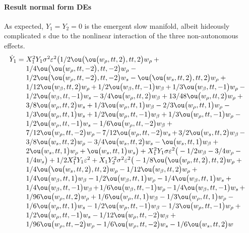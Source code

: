 \paragraph{Result normal form DEs}
As expected, \(Y_1=Y_2=0\) is the emergent slow manifold, albeit hideously complicated \sde{}s due to the nonlinear interaction of the three non-autonomous effects.
\begin{align*}&
\dot Y_{1}=\ParMath{ X_{1}^{2} Y_{1} \sigma ^{2} \eps^{2} \big(1/2 \ou\big(\ou
\big(w_{\rho },tt,2\big),tt,2\big) w_{\rho }+1/4 \ou\big(\ou\big(w_{
\rho },tt,-2\big),tt,-2\big) w_{\rho }-1/2 \ou\big(\ou\big(w_{\rho },tt,
-2\big),tt,-2\big) w_{s}-\ou\big(\ou\big(w_{s},tt,2\big),tt,2\big) w_{
\rho }+1/12 \ou\big(w_{\beta },tt,2\big) w_{\rho }+1/2 \ou\big(w_{\beta 
},tt,-1\big) w_{\beta }+1/3 \ou\big(w_{\beta },tt,-1\big) w_{\rho }-1/2 
\ou\big(w_{\beta },tt,-1\big) w_{s}-3/4 \ou\big(w_{\rho },tt,2\big) w_{
\beta }+13/48 \ou\big(w_{\rho },tt,2\big) w_{\rho }+3/8 \ou\big(w_{\rho 
},tt,2\big) w_{s}+1/3 \ou\big(w_{\rho },tt,1\big) w_{\beta }-2/3 \ou
\big(w_{\rho },tt,1\big) w_{\rho }-1/3 \ou\big(w_{\rho },tt,1\big) w_{s}
+1/2 \ou\big(w_{\rho },tt,-1\big) w_{\beta }+1/3 \ou\big(w_{\rho },tt,-1
\big) w_{\rho }-1/2 \ou\big(w_{\rho },tt,-1\big) w_{s}-1/6 \ou\big(w_{
\rho },tt,-2\big) w_{\beta }+7/12 \ou\big(w_{\rho },tt,-2\big) w_{\rho }
-7/12 \ou\big(w_{\rho },tt,-2\big) w_{s}+3/2 \ou\big(w_{s},tt,2\big) w_{
\beta }-3/8 \ou\big(w_{s},tt,2\big) w_{\rho }-3/4 \ou\big(w_{s},tt,2
\big) w_{s}-\ou\big(w_{s},tt,1\big) w_{\beta }+2 \ou\big(w_{s},tt,1\big)
 w_{\rho }+\ou\big(w_{s},tt,1\big) w_{s}\big)+X_{1}^{2} Y_{1} \sigma  
\eps^{2} \big(-1/2 w_{\beta }-3/4 w_{\rho }-1/4 w_{s}\big)+1/2 X_{1}^{2}
 Y_{1} \eps^{2}+X_{1} Y_{2}^{2} \sigma ^{2} \eps^{2} \big(-1/8 \ou\big(
\ou\big(w_{\rho },tt,2\big),tt,2\big) w_{\rho }+1/4 \ou\big(\ou\big(w_{s
},tt,2\big),tt,2\big) w_{\rho }-1/12 \ou\big(w_{\beta },tt,2\big) w_{
\rho }+1/4 \ou\big(w_{\beta },tt,1\big) w_{\beta }-1/2 \ou\big(w_{\beta 
},tt,1\big) w_{\rho }-1/4 \ou\big(w_{\beta },tt,1\big) w_{s}+1/4 \ou
\big(w_{\beta },tt,-1\big) w_{\beta }+1/6 \ou\big(w_{\beta },tt,-1\big) 
w_{\rho }-1/4 \ou\big(w_{\beta },tt,-1\big) w_{s}+1/96 \ou\big(w_{\rho }
,tt,2\big) w_{\rho }+1/6 \ou\big(w_{\rho },tt,1\big) w_{\beta }-1/3 \ou
\big(w_{\rho },tt,1\big) w_{\rho }-1/6 \ou\big(w_{\rho },tt,1\big) w_{s}
-1/2 \ou\big(w_{\rho },tt,-1\big) w_{\beta }-1/3 \ou\big(w_{\rho },tt,-1
\big) w_{\rho }+1/2 \ou\big(w_{\rho },tt,-1\big) w_{s}-1/12 \ou\big(w_{
\rho },tt,-2\big) w_{\beta }+1/96 \ou\big(w_{\rho },tt,-2\big) w_{\rho }
-1/6 \ou\big(w_{\rho },tt,-2\big) w_{s}-1/6 \ou\big(w_{s},tt,2\big) w_{
}}
\end{align*}
